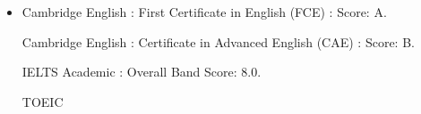 %
\begin{itemize}
    \setlength\itemsep{2em} %
    \iftrue
    \item {}
    \begin{itemize}%
        \iftrue
         Cambridge English : First Certificate in English (FCE) : Score: A.
        \fi
        \iftrue
         Cambridge English : Certificate in Advanced English (CAE) : Score: B.
        \fi
        \iftrue
         IELTS Academic : Overall Band Score: 8.0.
        \fi
        \iftrue
         TOEIC 
        \fi
%
    \end{itemize}%
    \fi
\end{itemize}